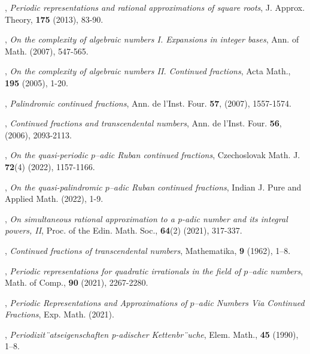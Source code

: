 \documentclass[12pt, reqno]{amsart}
\theoremstyle{plain}
\theoremstyle{definition}
\begin{document}
\begin{thebibliography}{}
,
\textit{Periodic representations and rational approximations of square roots},
\newblock J. Approx. Theory, \textbf{175} (2013), 83-90.

,
\textit{On the complexity of algebraic numbers I. Expansions in integer bases},
\newblock Ann. of Math. (2007), 547-565.

,
\textit{On the complexity of algebraic numbers II. Continued fractions},
\newblock Acta Math., \textbf{195} (2005), 1-20.

,
\textit{Palindromic continued fractions},
\newblock Ann. de l’Inst. Four. \textbf{57}, (2007), 1557-1574.

,
\textit{Continued fractions and transcendental numbers},
\newblock Ann. de l’Inst. Four. \textbf{56}, (2006), 2093-2113.

,
\textit{On the quasi-periodic $p$--adic Ruban continued fractions},
\newblock Czechoslovak Math. J. \textbf{72}(4) (2022), 1157-1166.

,
\textit{On the quasi-palindromic $p$--adic Ruban continued fractions},
\newblock Indian J. Pure and Applied Math. (2022), 1-9.

,
\textit{On simultaneous rational approximation to a p-adic number and its integral powers, II},
\newblock Proc. of the Edin. Math. Soc., \textbf{64}(2) (2021), 317-337.

,
\textit{Continued fractions of transcendental numbers},
\newblock Mathematika, \textbf{9} (1962), 1–8.

,
\textit{Periodic representations for quadratic irrationals in the field of $p$--adic numbers},
\newblock Math. of Comp., \textbf{90} (2021), 2267-2280.

,
\textit{Periodic Representations and Approximations of $p$--adic Numbers Via Continued Fractions},
\newblock Exp. Math. (2021).


,
\textit{Periodizit¨atseigenschaften p-adischer Kettenbr¨uche},
\newblock Elem. Math., \textbf{45}
(1990), 1–8.


\end{thebibliography}
\end{document}
